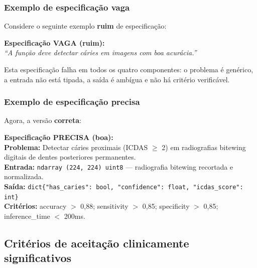 \subsubsection{Exemplo de especificação vaga}

Considere o seguinte exemplo \textbf{ruim} de especificação:

\begin{mdframed}[linecolor=corTesteFalha, linewidth=2pt, backgroundcolor=corTesteFalha!5]
  \textbf{Especificação VAGA (ruim):} \\
  \textit{``A função deve detectar cáries em imagens com boa acurácia.''}
\end{mdframed}

Esta especificação falha em todos os quatro componentes: o problema é
genérico, a entrada não está tipada, a saída é ambígua e não há critério
verificável.

\subsubsection{Exemplo de especificação precisa}

Agora, a versão \textbf{correta}:

\begin{mdframed}[linecolor=corTesteSucesso, linewidth=2pt, backgroundcolor=corTesteSucesso!5]
  \textbf{Especificação PRECISA (boa):} \\
  \textbf{Problema:} Detectar cáries proximais (ICDAS $\geq$ 2) em radiografias
  bitewing digitais de dentes posteriores permanentes. \\
  \textbf{Entrada:} \texttt{ndarray (224, 224) uint8} — radiografia bitewing
  recortada e normalizada. \\
  \textbf{Saída:} \texttt{dict\{"has\_caries": bool, "confidence": float, "icdas\_score": int\}} \\
  \textbf{Critérios:} accuracy $>$ 0,88; sensitivity $>$ 0,85; specificity $>$ 0,85;
  inference\_time $<$ 200ms.
\end{mdframed}


\subsection{Critérios de aceitação clinicamente significativos}

